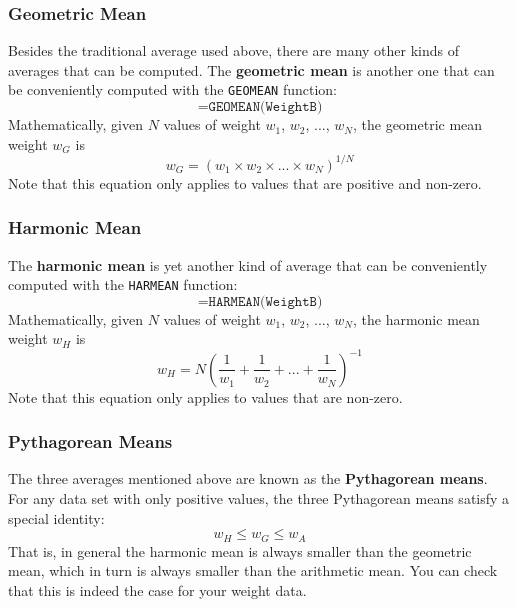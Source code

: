 \subsubsection{Geometric Mean}
Besides the traditional average used above, there are many other kinds of averages that can be computed. The \textbf{geometric mean} is another one that can be conveniently computed with the \texttt{GEOMEAN} function:
\begin{equation}
    \texttt{=GEOMEAN(WeightB)}
\end{equation}
Mathematically, given $N$ values of weight $w_{1}$, $w_{2}$, ..., $w_{N}$, the geometric mean weight $w_{G}$ is
\begin{equation}
    w_{G} = \left( w_{1} \times w_{2} \times ... \times w_{N} \right)^{1/N}
\end{equation}
Note that this equation only applies to values that are positive and non-zero.
\subsubsection{Harmonic Mean}
The \textbf{harmonic mean} is yet another kind of average that can be conveniently computed with the \texttt{HARMEAN} function:
\begin{equation}
    \texttt{=HARMEAN(WeightB)}
\end{equation}
Mathematically, given $N$ values of weight $w_{1}$, $w_{2}$, ..., $w_{N}$, the harmonic mean weight $w_{H}$ is
\begin{equation}
    w_{H} = N \left( \frac{1}{w_{1}} + \frac{1}{w_{2}} + ... + \frac{1}{w_{N}} \right)^{-1}
\end{equation}
Note that this equation only applies to values that are non-zero.
\subsubsection{Pythagorean Means}
The three averages mentioned above are known as the \textbf{Pythagorean means}. For any data set with only positive values, the three Pythagorean means satisfy a special identity:
\begin{equation}
    w_{H} \leq w_{G} \leq w_{A}
\end{equation}
That is, in general the harmonic mean is always smaller than the geometric mean, which in turn is always smaller than the arithmetic mean. You can check that this is indeed the case for your weight data.

